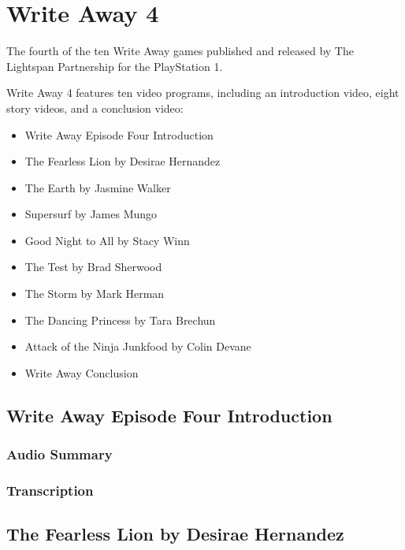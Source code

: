 \chapter{Write Away 4}


The fourth of the ten Write Away games published and released by The Lightspan Partnership for the PlayStation 1.

Write Away 4 features ten video programs, including an introduction video, eight story videos, and a conclusion video:

\begin{itemize}
    \item Write Away Episode Four Introduction
    \item The Fearless Lion by Desirae Hernandez
    \item The Earth by Jasmine Walker
    \item Supersurf by James Mungo
    \item Good Night to All by Stacy Winn
    \item The Test by Brad Sherwood
    \item The Storm by Mark Herman
    \item The Dancing Princess by Tara Brechun
    \item Attack of the Ninja Junkfood by Colin Devane
    \item Write Away Conclusion
\end{itemize}

\clearpage
\newpage

\section{Write Away Episode Four Introduction}

\subsection{Audio Summary}

\subsection{Transcription}

\section{The Fearless Lion by Desirae Hernandez}

